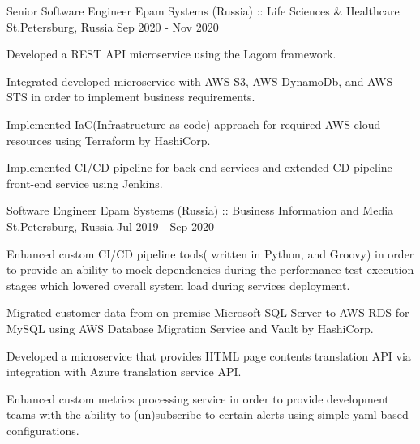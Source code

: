 \begin{cventries}
\cventry
{Senior Software Engineer} %
{Epam Systems (Russia) :: Life Sciences \& Healthcare} %
{St.Petersburg, Russia} %
{Sep 2020 - Nov 2020 } %
{
  \begin{cvitems} %
    \item {Developed a REST API microservice using the Lagom framework.}
    \item {Integrated developed microservice with AWS S3, AWS DynamoDb, and AWS STS in order to implement business requirements.}
    \item {Implemented IaC(Infrastructure as code) approach for required AWS cloud resources using Terraform by HashiCorp.}
    \item {Implemented CI/CD pipeline for back-end services and extended CD pipeline front-end service using Jenkins.}
  \end{cvitems}
}

\cventry
{Software Engineer} %
{Epam Systems (Russia) :: Business Information and Media} %
{St.Petersburg, Russia} %
{Jul 2019 - Sep 2020} %
{
  \begin{cvitems} %
    \item { Enhanced custom CI/CD pipeline tools( written in Python, and Groovy) 
    in order to provide an ability to mock dependencies during the performance test execution stages
     which lowered overall system load during services deployment.}
    \item {Migrated customer data from on-premise Microsoft SQL Server to AWS RDS for MySQL using AWS Database Migration Service and Vault by HashiCorp.}
    \item {Developed a microservice that provides HTML page contents translation API via integration with Azure translation service API.}
    \item {Enhanced custom metrics processing service in order to provide development teams with the ability to (un)subscribe to certain alerts using simple yaml-based configurations.}
  \end{cvitems}
}


\end{cventries}
